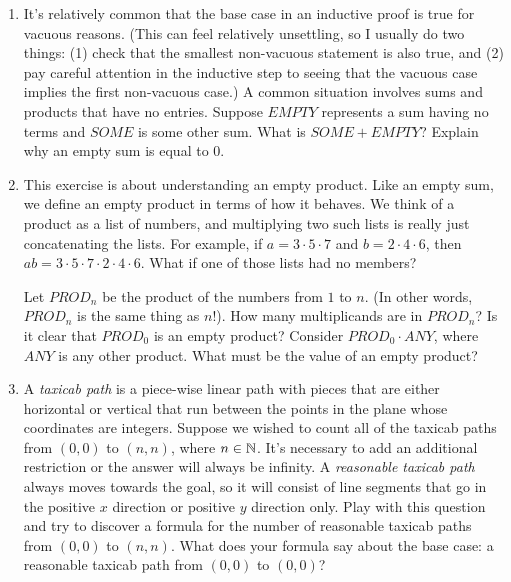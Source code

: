 \documentclass{amsart}
\begin{document}
\begin{enumerate}
\begin{proof}
\end{proof}

Hint: Look carefully at the early stages.

\vfill

\newpage

\item It's relatively common that the base case in an inductive proof is true for vacuous reasons.  (This can feel relatively unsettling, so I usually do two things: (1) check that the smallest non-vacuous statement is also true, and (2) pay careful attention in the inductive step to seeing that the vacuous case implies the first non-vacuous case.)  A common situation involves sums and products that have no entries.  Suppose $EMPTY$ represents a sum having no terms and $SOME$ is some other sum.  What is $SOME + EMPTY$?  Explain why an empty sum is equal to 0.

\vfill

\item This exercise is about understanding an empty product.  Like an empty sum, we define an empty product in terms of how it behaves. We think of a product as a list of numbers, and multiplying two such lists is really just concatenating the lists.  For example, if $a = 3\cdot 5\cdot 7$ and $b = 2\cdot 4 \cdot 6$, then $ab = 3\cdot 5\cdot 7\cdot 2\cdot 4 \cdot 6$.  What if one of those lists had no members?

Let $PROD_n$ be the product of the numbers from $1$ to $n$.  (In other words, $PROD_n$ is the same thing as $n!$).  How many multiplicands are in $PROD_n$?  Is it clear that $PROD_0$ is an empty product?  Consider $PROD_0 \cdot ANY$, where $ANY$ is any other product.  What must be the value of an empty product?

\vfill

\newpage

\item A {\em taxicab path} is a piece-wise linear path with pieces that are either horizontal or vertical that run between the points in the plane whose coordinates are integers.  Suppose we wished to count all of the taxicab paths from $(0,0)$ to $(n,n)$, where $n \in {\mathbb N}$.  It's necessary to add an  additional restriction or the answer will always be infinity.  A {\em reasonable taxicab path} always moves towards the goal, so it will consist of line segments that go in the positive $x$ direction or positive $y$ direction only. Play with this question and try to discover a formula for the number of reasonable taxicab paths from $(0,0)$ to $(n,n)$.  What does your formula say about the base case: a reasonable taxicab path from $(0,0)$ to $(0,0)$?

\vfill

\end{enumerate}
\end{document}
